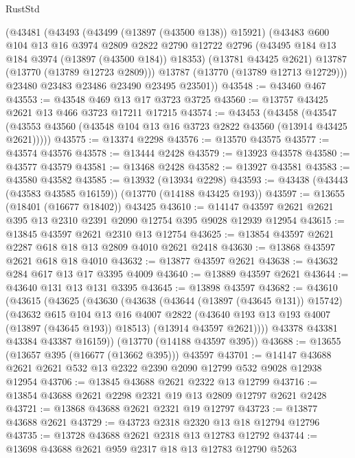 \begin{lexlean}{RustStd}
\begin{coremodule}
      (@43481
        (@43493
          (@43499 (@13897 (@43500 @138)) @15921)
          (@43483
            @600
            @104
            @13
            @16
            @3974
            @2809
            @2822
            @2790
            @12722
            @2796
            (@43495 @184 @13 @184 @3974 (@13897 (@43500 @184)) @18353)
            (@13781 @43425 @2621)
            @13787
            (@13770 (@13789 @12723 @2809)))
          @13787
          (@13770 (@13789 @12713 @12729)))
        @23480
        @23483
        @23486
        @23490
        @23495
        @23501))
@43548 := @43460 @467
@43553 := @43548 @469 @13 @17 @3723 @3725
@43560 := @13757 @43425 @2621 @13 @466 @3723 @17211 @17215
@43574 := @43453
    (@43458 (@43547 (@43553 @43560 (@43548 @104 @13 @16 @3723 @2822 @43560 (@13914 @43425 @2621)))))
@43575 := @13374 @2298
@43576 := @13570 @43575
@43577 := @43574 @43576
@43578 := @13444 @2428
@43579 := @13923 @43578
@43580 := @43577 @43579
@43581 := @13468 @2428
@43582 := @13927 @43581
@43583 := @43580 @43582
@43585 := @13932 (@13934 @2298)
@43593 := @43438 (@43443 (@43583 @43585 @16159)) (@13770 (@14188 @43425 @193))
@43597 := @13655 (@18401 (@16677 @18402)) @43425
@43610 := @14147 @43597 @2621 @2621 @395 @13 @2310 @2391 @2090 @12754 @395 @9028 @12939 @12954
@43615 := @13845 @43597 @2621 @2310 @13 @12754
@43625 := @13854 @43597 @2621 @2287 @618 @18 @13 @2809 @4010 @2621 @2418
@43630 := @13868 @43597 @2621 @618 @18 @4010
@43632 := @13877 @43597 @2621
@43638 := @43632 @284 @617 @13 @17 @3395 @4009
@43640 := @13889 @43597 @2621
@43644 := @43640 @131 @13 @131 @3395
@43645 := @13898 @43597
@43682 := @43610
    (@43615
      (@43625
        (@43630
          (@43638
            (@43644 (@13897 (@43645 @131)) @15742)
            (@43632
              @615
              @104
              @13
              @16
              @4007
              @2822
              (@43640 @193 @13 @193 @4007 (@13897 (@43645 @193)) @18513)
              (@13914 @43597 @2621))))
        @43378
        @43381
        @43384
        @43387
        @16159))
    (@13770 (@14188 @43597 @395))
@43688 := @13655 (@13657 @395 (@16677 (@13662 @395))) @43597
@43701 := @14147 @43688 @2621 @2621 @532 @13 @2322 @2390 @2090 @12799 @532 @9028 @12938 @12954
@43706 := @13845 @43688 @2621 @2322 @13 @12799
@43716 := @13854 @43688 @2621 @2298 @2321 @19 @13 @2809 @12797 @2621 @2428
@43721 := @13868 @43688 @2621 @2321 @19 @12797
@43723 := @13877 @43688 @2621
@43729 := @43723 @2318 @2320 @13 @18 @12794 @12796
@43735 := @13728 @43688 @2621 @2318 @13 @12783 @12792
@43744 := @13698 @43688 @2621 @959 @2317 @18 @13 @12783 @12790 @5263

\end{coremodule}
\end{lexlean}

